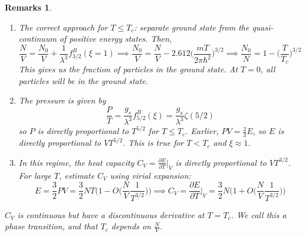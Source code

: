 \documentclass[a4paper]{article}
\newtheorem{remarks}{Remarks}[section]
\theoremstyle{new}
\begin{document}
\begin{remarks}\leavevmode
\begin{enumerate}
    \item The correct approach for $T\leq T_c$: separate ground state from the quasi-continuum of positive energy states. Then,
$$\frac{N}{V}=\frac{N_0}{V}+\frac{1}{\lambda^3}f_{3/2}^B(\xi=1)\implies\frac{N_0}{V}=\frac{N}{V}-2.612\bigg(\frac{mT}{2\pi\hbar^2}\bigg)^{3/2}\implies\frac{N_0}{N}=1-\bigg(\frac{T}{T_c}\bigg)^{3/2}$$
This gives us the fraction of particles in the ground state. At $T=0$, all particles will be in the ground state.
\begin{center}
\end{center}
\item The pressure is given by
$$\frac{P}{T}=\frac{g_s}{\lambda^3}f_{5/2}^B(\xi)=\frac{g_s}{\lambda^3}\zeta(5/2)$$
so $P$ is directly proportional to $T^{5/2}$ for $T\leq T_c$. Earlier, $PV=\frac{2}{3}E$, so $E$ is directly proportional to $VT^{5/2}$. This is true for $T< T_c$ and $\xi\approx 1$. 
\item In this regime, the heat capacity $C_V=\frac{\partial E}{\partial T}|_V$ is directly proportional to $VT^{3/2}$. For large $T$, estimate $C_V$ using virial expansion:
$$E=\frac{3}{2}PV=\frac{3}{2}NT\bigg(1-O\bigg(\frac{N}{V}\frac{1}{T^{3/2}}\bigg)\bigg)\implies C_V=\frac{\partial E}{\partial T}\bigg|_V=\frac{3}{2}N\bigg(1+O\bigg(\frac{N}{V}\frac{1}{T^{3/2}}\bigg)\bigg)$$
\begin{center}
\end{center}
\end{enumerate}
\item $C_V$ is continuous but have a discontinuous derivative at $T=T_c$. We call this a phase transition, and that $T_c$ depends on $\frac{N}{V}$.
\end{remarks}
\end{document}
